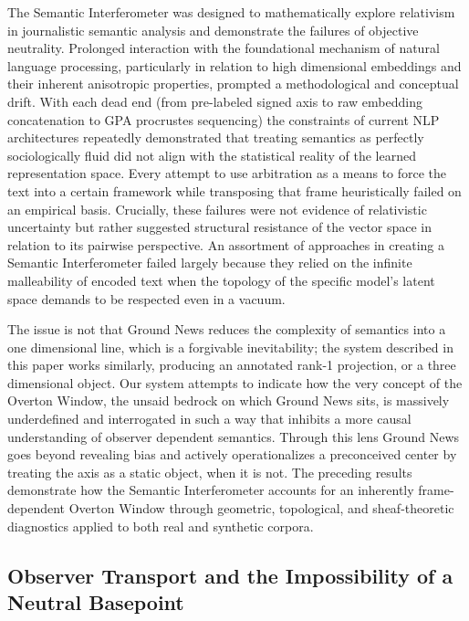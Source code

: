 The Semantic Interferometer was designed to mathematically explore relativism in journalistic semantic analysis and demonstrate the failures of objective neutrality. Prolonged interaction with the foundational mechanism of natural language processing, particularly in relation to high dimensional embeddings and their inherent anisotropic properties, prompted a methodological and conceptual drift. With each dead end (from pre-labeled signed axis to raw embedding concatenation to GPA procrustes sequencing) the constraints of current NLP architectures repeatedly demonstrated that treating semantics as perfectly sociologically fluid did not align with the statistical reality of the learned representation space. Every attempt to use arbitration as a means to force the text into a certain framework while transposing that frame heuristically failed on an empirical basis. Crucially, these failures were not evidence of relativistic uncertainty but rather suggested structural resistance of the vector space in relation to its pairwise perspective. An assortment of approaches in creating a Semantic Interferometer failed largely because they relied on the infinite malleability of encoded text when the topology of the specific model's latent space demands to be respected even in a vacuum.

The issue is not that Ground News reduces the complexity of semantics into a one dimensional line, which is a forgivable inevitability; the system described in this paper works similarly, producing an annotated rank-1 projection, or a three dimensional object. Our system attempts to indicate how the very concept of the Overton Window, the unsaid bedrock on which Ground News sits, is massively underdefined and interrogated in such a way that inhibits a more causal understanding of observer dependent semantics. Through this lens Ground News goes beyond revealing bias and actively operationalizes a preconceived center by treating the axis as a static object, when it is not. The preceding results demonstrate how the Semantic Interferometer accounts for an inherently frame-dependent Overton Window through geometric, topological, and sheaf-theoretic diagnostics applied to both real and synthetic corpora.

\subsection{Observer Transport and the Impossibility of a Neutral Basepoint}

